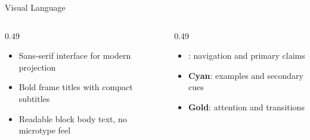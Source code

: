 \documentclass{beamer}
\begin{document}
\begin{frame}{Visual Language}
    \begin{columns}[T]
        \begin{column}{0.49\textwidth}
            \begin{itemize}
                \item Sans-serif interface for modern projection
                \item Bold frame titles with compact subtitles
                \item Readable block body text, no microtype feel
            \end{itemize}
        \end{column}
        \begin{column}{0.49\textwidth}
            \begin{itemize}
                \item {}: navigation and primary claims
                \item \textbf{\textcolor{hhuCyan}{Cyan}}: examples and secondary cues
                \item \textbf{\textcolor{hhuGold}{Gold}}: attention and transitions
            \end{itemize}
        \end{column}
    \end{columns}
    \vspace{10pt}
    \begin{center}
    \end{center}
\end{frame}
\end{document}
